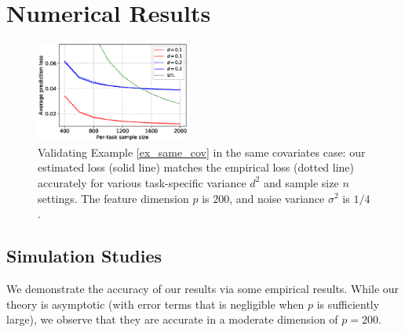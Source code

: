 \section{Numerical Results}\label{sec_exp}




\begin{figure}[!t]
	\centering
	\includegraphics[width=0.45\textwidth]{figures/same_covariates.eps}
	\caption{Validating Example \ref{ex_same_cov} in the same covariates case: our estimated loss (solid line) matches the empirical loss (dotted line) accurately for various task-specific variance $d^2$ and sample size $n$ settings. The feature dimension $p$ is $200$, and noise variance $\sigma^2$ is $1/4$. }
	\label{fig_same_cov}
\end{figure}

\subsection{Simulation Studies}\label{sec_simulation}

We demonstrate the accuracy of our results via some empirical results.
While our theory is asymptotic (with error terms that is negligible when $p$ is sufficiently large), we observe that they are accurate in a moderate dimension of $p = 200$.


